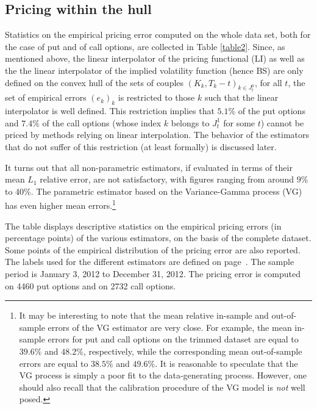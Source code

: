 \documentclass[11pt]{article}
\theoremstyle{remark}
\begin{document}
\subsection{Pricing within the hull}
Statistics on the empirical pricing error computed on the whole data
set, both for the case of put and of call options, are collected in
Table \ref{table2}. Since, as mentioned above, the linear interpolator
of the pricing functional (LI) as well as the the linear interpolator
of the implied volatility function (hence BS) are only defined on the
convex hull of the sets of couples $(K_k,T_k-t)_{k \in J_t^0}$, for
all $t$, the set of empirical errors $(e_k)_k$ is restricted to those
$k$ such that the linear interpolator is well defined. This
restriction implies that $5.1\%$ of the put options and $7.4\%$ of the
call options (whose index $k$ belongs to $J_t^1$ for some $t$) cannot
be priced by methods relying on linear interpolation. The behavior of
the estimators that do not suffer of this restriction (at least
formally) is discussed later.

It turns out that all non-parametric estimators, if evaluated in terms
of their mean $L_1$ relative error, are not satisfactory, with figures
ranging from around 9\% to 40\%. The parametric estimator based on the
Variance-Gamma process (VG) has even higher mean errors.\footnote{It
  may be interesting to note that the mean relative in-sample and
  out-of-sample errors of the VG estimator are very close. For
  example, the mean in-sample errors for put and call options on the
  trimmed dataset are equal to $39.6\%$ and $48.2\%$, respectively,
  while the corresponding mean out-of-sample errors are equal to
  $38.5\%$ and $49.6\%$. It is reasonable to speculate that the VG
  process is simply a poor fit to the data-generating
  process. However, one should also recall that the calibration
  procedure of the VG model is \emph{not} well posed.}

\begin{table}[tbp]
\caption{Pricing errors on the full dataset}
\begin{center}
\vspace{2mm}
\parbox{\textwidth}{\footnotesize The table displays descriptive
  statistics on the empirical pricing errors (in percentage points) of
  the various estimators, on the basis of the complete dataset. Some
  points of the empirical distribution of the pricing error are also
  reported.  The labels used for the different estimators are defined
  on page~\pageref{etichette}. The sample period is January 3, 2012 to
  December 31, 2012. The pricing error is computed on 4460 put options
  and on 2732 call options. \vspace{4mm}}
\footnotesize{{}}
\end{center}
\label{table2}
\end{table}
\end{document}
